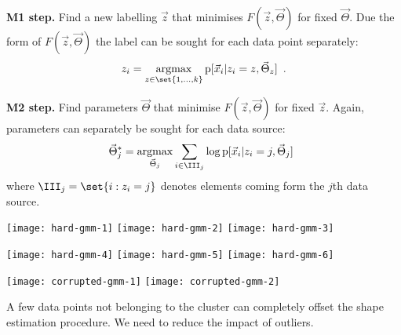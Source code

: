 \documentclass[landscape,footrule]{foils}
\newcommand{\pd}[1]{\mathrm{p}[#1]}
\DeclareMathOperator*{\argmax}{argmax}
\begin{document}



\textbf{M1 step.} Find a new labelling $\vec{z}$ that minimises $F(\vec{z},\vec{\Theta})$ for fixed $\vec{\Theta}$. Due the form of $F(\vec{z},\vec{\Theta})$ the label can be sought for each data point separately:
\begin{align*}
 z_i=\argmax_{z\in\set{1,\ldots,k}} \pd{\vec{x}_i|z_i=z,\vec{\Theta}_{z}}\enspace.
\end{align*}


\textbf{M2 step.} Find parameters $\vec{\Theta}$ that minimise $F(\vec{z},\vec{\Theta})$ for fixed $\vec{z}$. Again, parameters can separately be sought for each data source:
\begin{align*}
 \vec{\Theta}_j^*=\argmax_{\vec{\Theta}_j} \sum_{i\in\III_j}\log \pd{\vec{x}_i|z_i=j,\vec{\Theta}_{j}}\enspace
\end{align*}
where $\III_j=\set{i: z_i=j}$ denotes elements coming form the $j$th data source.


\begin{center}
\texttt{[image: hard-gmm-1]}\hspace*{-1cm}
\texttt{[image: hard-gmm-2]}\hspace*{-1cm}
\texttt{[image: hard-gmm-3]}
\vspace{-2cm}

\texttt{[image: hard-gmm-4]}\hspace*{-1cm}
\texttt{[image: hard-gmm-5]}\hspace*{-1cm}
\texttt{[image: hard-gmm-6]}
\vspace*{-1cm}
\end{center}


\begin{center}
\hspace*{-1cm}
\texttt{[image: corrupted-gmm-1]}\hspace*{-2cm}
\texttt{[image: corrupted-gmm-2]}
\end{center}
\vspace*{-2cm}
A few data points not belonging to the cluster can completely offset the shape estimation procedure. We need to reduce the impact of  outliers.\vspace*{-1cm}

\end{document}
